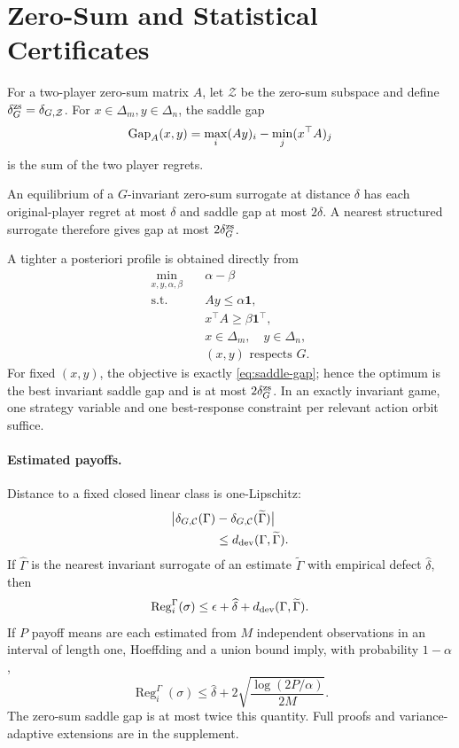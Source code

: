 \section{Zero-Sum and Statistical Certificates}

For a two-player zero-sum matrix $A$, let $\mathcal Z$ be the zero-sum subspace and define $\delta_G^{\mathrm{zs}}=\delta_{G,\mathcal Z}$.  For $x\in\Delta_m,y\in\Delta_n$, the saddle gap
\begin{equation}
\operatorname{Gap}_A(x,y)
=
\max_i(Ay)_i-\min_j(x^\top A)_j
\label{eq:saddle-gap}
\end{equation}
is the sum of the two player regrets.

\begin{corollary}
\label{cor:zs-transfer}
An equilibrium of a $G$-invariant zero-sum surrogate at distance $\delta$ has each original-player regret at most $\delta$ and saddle gap at most $2\delta$.  A nearest structured surrogate therefore gives gap at most $2\delta_G^{\mathrm{zs}}$.
\end{corollary}

A tighter a posteriori profile is obtained directly from
\begin{align}
\min_{x,y,\alpha,\beta}\quad
&\alpha-\beta
\label{eq:invariant-gap-lp}\\
\text{s.t.}\quad
&Ay\le\alpha\mathbf1,\nonumber\\
&x^\top A\ge\beta\mathbf1^\top,\nonumber\\
&x\in\Delta_m,\quad y\in\Delta_n,\nonumber\\
&(x,y)\text{ respects }G.\nonumber
\end{align}
For fixed $(x,y)$, the objective is exactly \eqref{eq:saddle-gap}; hence the optimum is the best invariant saddle gap and is at most $2\delta_G^{\mathrm{zs}}$.  In an exactly invariant game, one strategy variable and one best-response constraint per relevant action orbit suffice.

\paragraph{Estimated payoffs.}
Distance to a fixed closed linear class is one-Lipschitz:
\begin{align}
\big|\delta_{G,\mathcal C}(\Gamma)
&-\delta_{G,\mathcal C}(\widetilde\Gamma)\big|
\nonumber\\
&\le d_{\mathrm{dev}}(\Gamma,\widetilde\Gamma).
\label{eq:defect-stability}
\end{align}
If $\widehat\Gamma$ is the nearest invariant surrogate of an estimate $\widetilde\Gamma$ with empirical defect $\widehat\delta$, then
\[
\operatorname{Reg}_i^\Gamma(\sigma)
\le
\epsilon+\widehat\delta+
d_{\mathrm{dev}}(\Gamma,\widetilde\Gamma).
\]
If $P$ payoff means are each estimated from $M$ independent observations in an interval of length one, Hoeffding and a union bound imply, with probability $1-\alpha$,
\begin{equation}
\operatorname{Reg}_i^\Gamma(\sigma)
\le
\widehat\delta
+2\sqrt{\frac{\log(2P/\alpha)}{2M}}.
\label{eq:sampling-certificate}
\end{equation}
The zero-sum saddle gap is at most twice this quantity.  Full proofs and variance-adaptive extensions are in the supplement.
